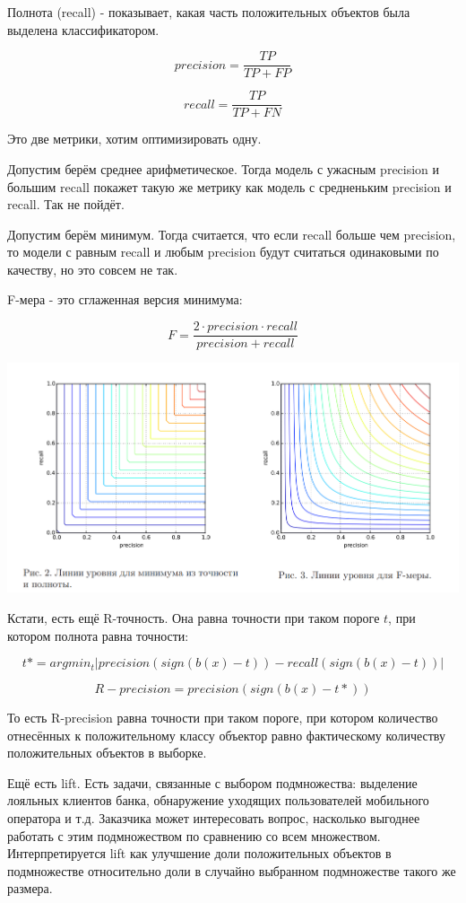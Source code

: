 \documentclass[a4paper]{article}
\begin{document}
\begin{itemize}
Полнота (recall) - показывает, какая часть положительных объектов была выделена классификатором.

\[ precision = \frac{TP}{TP+FP} \]

\[ recall = \frac{TP}{TP+FN} \]

Это две метрики, хотим оптимизировать одну.

Допустим берём среднее арифметическое. Тогда модель с ужасным precision и большим recall покажет такую же метрику как модель с средненьким precision и recall. Так не пойдёт.

Допустим берём минимум. Тогда считается, что если recall больше чем precision, то модели с равным recall и любым precision будут считаться одинаковыми по качеству, но это совсем не так.

F-мера - это сглаженная версия минимума:

\[ F = \frac{2 \cdot precision \cdot recall}{precision + recall} \]

\includegraphics[width=18cm]{f-measure.png}

Кстати, есть ещё R-точность. Она равна точности при таком пороге $t$, при котором полнота равна точности:

\[ t* = argmin_t |precision(sign(b(x)-t)) - recall(sign(b(x) - t))| \]

\[R-precision = precision(sign(b(x)-t*))\]

То есть R-precision равна точности при таком пороге, при котором количество отнесённых к положительному классу объектор равно фактическому количеству положительных объектов в выборке.

Ещё есть lift. Есть задачи, связанные с выбором подмножества: выделение лояльных клиентов банка, обнаружение уходящих пользователей мобильного оператора и т.д. Заказчика может интересовать вопрос, насколько выгоднее работать с этим подмножеством по сравнению со всем множеством.
Интерпретируется lift как улучшение доли положительных объектов в подмножестве относительно доли в случайно выбранном подмножестве такого же размера.


\end{itemize}
\end{document}
